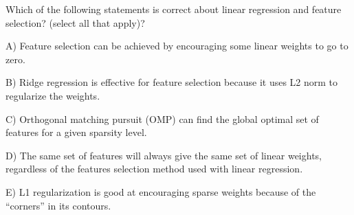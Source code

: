 Which of the following statements is correct about linear regression and feature selection? (select all that apply)?


A) Feature selection can be achieved by encouraging some linear weights to go to zero.


B) Ridge regression is effective for feature selection because it uses L2 norm to regularize the weights.


C) Orthogonal matching pursuit (OMP) can find the global optimal set of features for a given sparsity level.


D) The same set of features will always give the same set of linear weights, regardless of the features selection method used with linear regression.


E) L1 regularization is good at encouraging sparse weights because of the “corners” in its contours.
